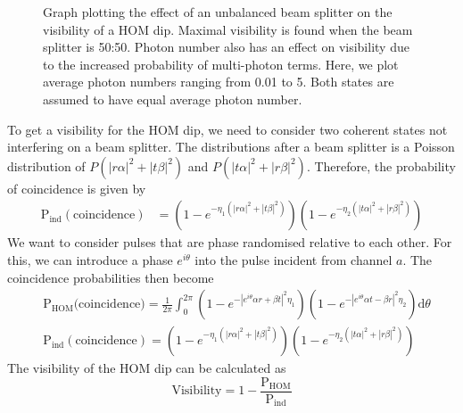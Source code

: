 \begin{figure}[tbp]
	\caption[Coherent state photon number visibility]{Graph plotting the effect of an unbalanced beam splitter on the visibility of a HOM dip. Maximal visibility is found when the beam splitter is 50:50. Photon number also has an effect on visibility due to the increased probability of multi-photon terms. Here, we plot average photon numbers ranging from 0.01 to 5. Both states are assumed to have equal average photon number.}
	\label{fig:HOM_BS_Vis}
\end{figure}

To get a visibility for the HOM dip, we need to consider two coherent states not interfering on a beam splitter. The distributions after a beam splitter is a Poisson distribution of $P(|r\alpha|^2 + |t\beta|^2)$ and $P(|t\alpha|^2 + |r\beta|^2)$. Therefore, the probability of coincidence is given by
\begin{align}
	\text{P}_\text{ind}(\text{coincidence}) &= \left(1 - e^{-\eta_1(|r\alpha|^2 + |t\beta|^2)}\right)\left(1 - e^{-\eta_2(|t\alpha|^2 + |r\beta|^2)}\right)
\end{align}
We want to consider pulses that are phase randomised relative to each other. For this, we can introduce a phase $e^{i\theta}$ into the pulse incident from channel $a$. The coincidence probabilities then become
\begin{align}
	&\text{P}_\text{HOM}\text{(coincidence)} = \frac{1}{2\pi}\int_0^{2\pi}\left(1 - e^{-|e^{i\theta}\alpha r + \beta t|^2 \eta_1}\right)\left(1 - e^{-|e^{i\theta}\alpha t - \beta r|^2 \eta_2}\right)\text{d}\theta\\
	&\text{P}_\text{ind}(\text{coincidence}) = \left(1 - e^{-\eta_1(|r\alpha|^2 + |t\beta|^2)}\right)\left(1 - e^{-\eta_2(|t\alpha|^2 + |r\beta|^2)}\right)
\end{align}
The visibility of the HOM dip can be calculated as
\begin{equation}
	\text{Visibility} = 1 - \frac{\text{P}_\text{HOM}}{\text{P}_\text{ind}}
\end{equation}

